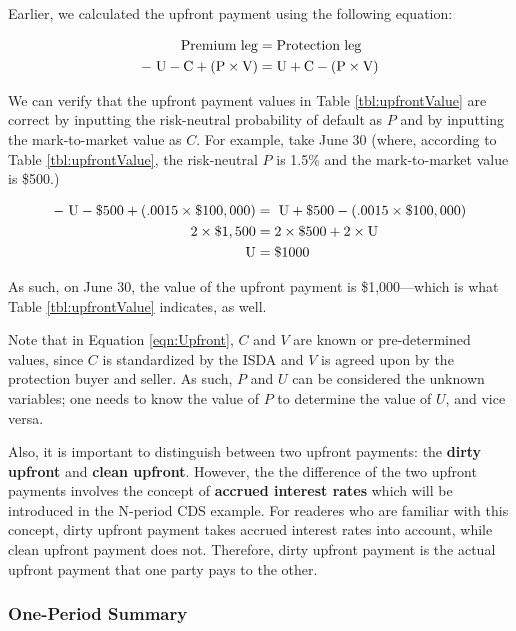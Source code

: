 \documentclass{jss}
\begin{document}
Earlier, we calculated the upfront payment using the following equation:

\label{eqn:Upfront}
\begin{align}
  \rm Premium\hspace{3pt}leg &= \rm Protection\hspace{3pt}leg \\
  \rm -\hspace{3pt}U - C + (P \times V) &= \rm U + C - (P \times V)
\end{align}

We can verify that the upfront payment values in Table \ref{tbl:upfrontValue} are correct by inputting the risk-neutral probability of default as $P$ and by inputting the mark-to-market value as $C$. For example, take June 30 (where, according to Table \ref{tbl:upfrontValue}, the risk-neutral $P$ is 1.5\% and the mark-to-market value is \$500.)

\begin{align}
  \rm -\hspace{3pt}U - \$500 + (.0015 \times \$100,000) &= \rm \hspace{3pt}U + \$500 - (.0015 \times \$100,000) \\
  \rm 2 \times \$1,500 &= \rm 2 \times \$500 + 2 \times U \\
  \rm U &= \rm\$1000
\end{align}

As such, on June 30, the value of the upfront payment is \$1,000---which is what Table \ref{tbl:upfrontValue} indicates, as well.

Note that in Equation \ref{eqn:Upfront}, $C$ and $V$ are known or pre-determined values, since $C$ is standardized by the ISDA and $V$ is agreed upon by the protection buyer and seller. As such, $P$ and $U$ can be considered the unknown variables; one needs to know the value of $P$ to determine the value of $U$, and vice versa.

Also, it is important to distinguish between two upfront payments: the \textbf{dirty upfront} and \textbf{clean upfront}. However, the the difference of the two upfront payments involves the concept of \textbf{accrued interest rates} which will be introduced in the N-period CDS example. For readeres who are familiar with this concept, dirty upfront payment takes accrued interest rates into account, while clean upfront payment does not. Therefore, dirty upfront payment is the actual upfront payment that one party pays to the other.

\subsubsection{One-Period Summary}
\label{sec:Sum}
\end{document}
